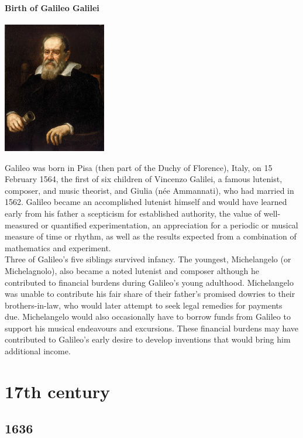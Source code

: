 \documentclass[11pt]{report}
\begin{document}
\subsection{Birth of Galileo Galilei}
\vspace{2mm}\begin{center}\includegraphics[width=4.5cm]{./img/galileo.jpg}\end{center}
Galileo was born in Pisa (then part of the Duchy of Florence), Italy, on 15 February 1564, the first of six children of Vincenzo Galilei, a famous lutenist, composer, and music theorist, and Giulia (née Ammannati), who had married in 1562. Galileo became an accomplished lutenist himself and would have learned early from his father a scepticism for established authority, the value of well-measured or quantified experimentation, an appreciation for a periodic or musical measure of time or rhythm, as well as the results expected from a combination of mathematics and experiment.\\
Three of Galileo's five siblings survived infancy. The youngest, Michelangelo (or Michelagnolo), also became a noted lutenist and composer although he contributed to financial burdens during Galileo's young adulthood. Michelangelo was unable to contribute his fair share of their father's promised dowries to their brothers-in-law, who would later attempt to seek legal remedies for payments due. Michelangelo would also occasionally have to borrow funds from Galileo to support his musical endeavours and excursions. These financial burdens may have contributed to Galileo's early desire to develop inventions that would bring him additional income.

		
\part{17th century}
\chapter{1636}
\end{document}
